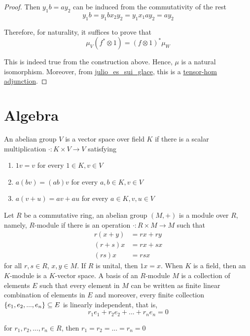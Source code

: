 \begin{proposition}
\begin{proof}
		Then $y_1 b = a y_2$ can be induced from the commutativity of the rest
		$$
		y_1 b = y_1 b x_2 y_2 = y_1 x_1 a y_2 = a y_2
		$$
		
		Therefore, for naturality, it suffices to prove that 
		$$
		\mu_V (f^* \otimes 1) = (f \otimes 1)^* \mu_W
		$$
		
		This is indeed true from the construction above. Hence, $\mu$ is a natural isomorphism. Moreover, from \href{https://math.stackexchange.com/a/4718941/700,122}{julio\_es\_sui\_glace}, this is a \href{https://en.wikipedia.org/wiki/Tensor-hom_adjunction}{tensor-hom adjunction}.
	\end{proof}
\end{proposition}



\section{Algebra}

\begin{definition}
	An abelian group $V$ is a vector space over field $K$ if there is a scalar multiplication $\cdot: K \times V \to V$ satisfying
	\begin{enumerate}
		\item $1 v = v$ for every $1 \in K, v \in V$
		\item $a (b v) = (ab) v$ for every $a, b \in K, v \in V$
		\item $a (v + u) = a v + a u$ for every $a \in K, v, u \in V$
	\end{enumerate}
\end{definition}

\begin{definition}
	Let $R$ be a commutative ring, an abelian group $(M, +)$ is a module over $R$, namely, $R$-module if there is an operation $\cdot: R \times M \to M$ such that 
	\begin{align*}
		r (x + y) &= rx + ry \\
		(r + s) x &= rx + sx \\
		(rs) x &= rsx
	\end{align*}
	for all $r, s \in R$, $x, y \in M$. If $R$ is unital, then $1x = x$. When $K$ is a field, then an $K$-module is a $K$-vector space. A basis of an $R$-module $M$ is a collection of elements $E$ such that every element in $M$ can be written as finite linear combination of elements in $E$ and moreover, every finite collection $\{e_1, e_2, ..., e_n\} \subseteq E$ is linearly independent, that is,
	$$
		r_1 e_1 + r_2 e_2 + ... + r_n e_n = 0
	$$
	
	for $r_1, r_2, ..., r_n \in R$, then $r_1 = r_2 = ... = r_n = 0$
\end{definition}

